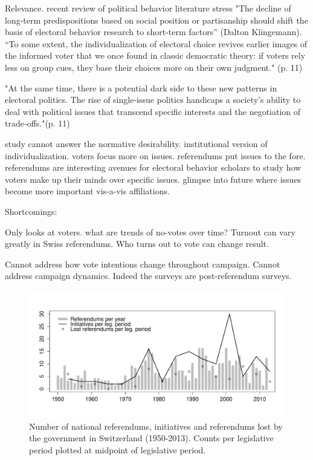 \documentclass[11pt,a4paper]{article}
\begin{document}
    Relevance. recent review of political behavior literature stress "The  decline	of	long‐term	predispositions	based	on	social	position	or	partisanship	should	shift	the	basis	of	electoral behavior	research	to	short‐term	factors'' (Dalton Klingemann). 
    ``To  some	extent,	the	individualization	of
    electoral	choice	revives	earlier	images	of	the	informed	voter	that	we	once	found	in	classic	democratic	theory:	if
    voters	rely	less	on	group	cues,	they	base	their	choices	more	on	their	own	judgment." (p. 11)
    
    "At  the	same	time,	there	is	a	potential	dark	side	to	these	new	patterns	in	electoral	politics.	The	rise	of	single‐issue
    politics	handicaps	a	society's	ability	to	deal	with	political	issues	that	transcend	specific	interests	and	the
    negotiation	of	trade‐offs."(p. 11)
    
    study cannot answer the normative desirability. institutional version of individualization. voters focus more on issues. referendums put issues to the fore. referendums are interesting avenues for electoral behavior scholars to study how voters make up their minds over specific issues. glimpse into future where issues become more important vis-a-vis affiliations.
    
    Shortcomings:
    
    Only looks at voters. what are trends of no-votes over time? Turnout can vary greatly in Swiss referendums. Who turns out to vote can change result. 
    
    Cannot address how vote intentions change throughout campaign. Cannot address campaign dynamics. Indeed the surveys are post-referendum surveys.

\begin{figure}[htb]
\includegraphics[width=\textwidth]{../../figures/figure.pdf}    
\caption{Number of national referendums, initiatives and referendums lost by the government in Switzerland (1950-2013). Counts per legislative period plotted at midpoint of legislative period.}\label{fig}
\end{figure}
\end{document}
